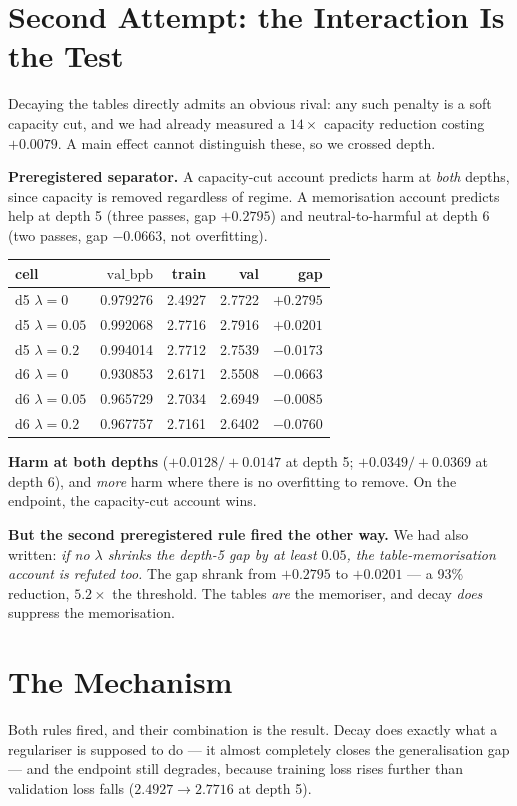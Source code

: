 \documentclass{article}
\newcommand{\vb}{\mathrm{val\_bpb}}
\begin{document}
\section{Second Attempt: the Interaction Is the Test}
Decaying the tables directly admits an obvious rival: any such penalty is a soft capacity cut, and we had already measured a $14\times$ capacity reduction costing $+0.0079$. A main effect cannot distinguish these, so we crossed depth.

\textbf{Preregistered separator.} A capacity-cut account predicts harm at \emph{both} depths, since capacity is removed regardless of regime. A memorisation account predicts help at depth 5 (three passes, gap $+0.2795$) and neutral-to-harmful at depth 6 (two passes, gap $-0.0663$, not overfitting).

\begin{center}\begin{small}
\begin{tabular}{lrrrr}
\toprule
cell & $\vb$ & train & val & gap \\
\midrule
d5 $\lambda{=}0$    & 0.979276 & 2.4927 & 2.7722 & $+0.2795$ \\
d5 $\lambda{=}0.05$ & 0.992068 & 2.7716 & 2.7916 & $+0.0201$ \\
d5 $\lambda{=}0.2$  & 0.994014 & 2.7712 & 2.7539 & $-0.0173$ \\
d6 $\lambda{=}0$    & 0.930853 & 2.6171 & 2.5508 & $-0.0663$ \\
d6 $\lambda{=}0.05$ & 0.965729 & 2.7034 & 2.6949 & $-0.0085$ \\
d6 $\lambda{=}0.2$  & 0.967757 & 2.7161 & 2.6402 & $-0.0760$ \\
\bottomrule
\end{tabular}
\end{small}\end{center}

\textbf{Harm at both depths} ($+0.0128/+0.0147$ at depth 5; $+0.0349/+0.0369$ at depth 6), and \emph{more} harm where there is no overfitting to remove. On the endpoint, the capacity-cut account wins.

\textbf{But the second preregistered rule fired the other way.} We had also written: \emph{if no $\lambda$ shrinks the depth-5 gap by at least $0.05$, the table-memorisation account is refuted too.} The gap shrank from $+0.2795$ to $+0.0201$ --- a 93\% reduction, $5.2\times$ the threshold. The tables \emph{are} the memoriser, and decay \emph{does} suppress the memorisation.

\section{The Mechanism}
Both rules fired, and their combination is the result. Decay does exactly what a regulariser is supposed to do --- it almost completely closes the generalisation gap --- and the endpoint still degrades, because training loss rises further than validation loss falls ($2.4927 \to 2.7716$ at depth 5).
\end{document}
